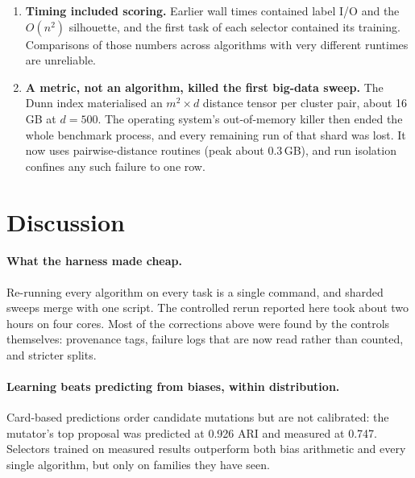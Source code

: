 \documentclass[11pt,a4paper]{article}
\newcommand{\code}[1]{\texttt{#1}}
\begin{document}
\begin{enumerate}
\begin{itemize}
    directory. This explains its missing round-14 results.
    \item The results Parquet file failed to write (heterogeneous
    \code{extra} column) and the error was swallowed.
  \end{itemize}
  \item \textbf{Timing included scoring.} Earlier wall times contained label
  I/O and the $O(n^2)$ silhouette, and the first task of each selector
  contained its training. Comparisons of those numbers across algorithms with
  very different runtimes are unreliable.
  \item \textbf{A metric, not an algorithm, killed the first big-data sweep.}
  The Dunn index materialised an $m^2 \times d$ distance tensor per cluster
  pair, about 16\,GB at $d = 500$. The operating system's out-of-memory
  killer then ended the whole benchmark process, and every remaining run of
  that shard was lost. It now uses pairwise-distance routines (peak about
  0.3\,GB), and run isolation confines any such failure to one row.
\end{enumerate}

\section{Discussion}\label{sec:discussion}

\paragraph{What the harness made cheap.} Re-running every algorithm on every
task is a single command, and sharded sweeps merge with one script. The
controlled rerun reported here took about two hours on four cores. Most of the
corrections above were found by the controls themselves: provenance tags,
failure logs that are now read rather than counted, and stricter splits.

\paragraph{Learning beats predicting from biases, within distribution.}
Card-based predictions order candidate mutations but are not calibrated: the
mutator's top proposal was predicted at 0.926 ARI and measured at 0.747.
Selectors trained on measured results outperform both bias arithmetic and
every single algorithm, but only on families they have seen.
\end{document}
